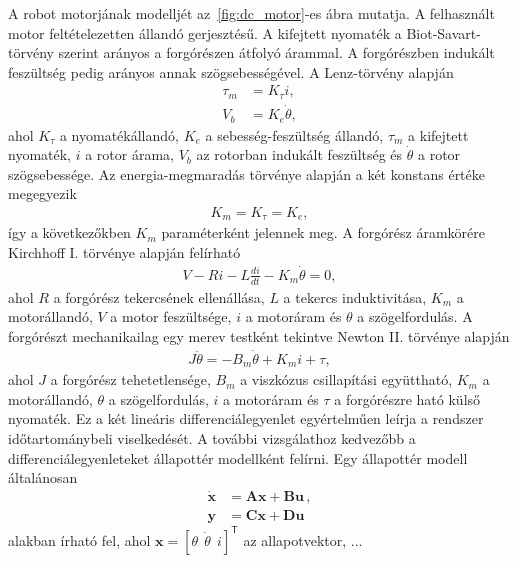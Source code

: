A robot motorjának modelljét az~\ref{fig:dc_motor}-es ábra mutatja. A felhasznált motor feltételezetten állandó gerjesztésű. A kifejtett nyomaték 
a Biot-Savart-törvény szerint arányos a forgórészen átfolyó árammal. A forgórészben
indukált feszültség pedig arányos annak szögsebességével. A Lenz-törvény alapján 
\begin{equation}
\begin{split}
    \tau_m &= K_\tau i, \\
    V_b &= K_e \dot\theta,
\end{split}
\end{equation}
ahol $K_\tau$ a nyomatékállandó, $K_e$ a sebesség-feszültség állandó, $\tau_m$ a kifejtett 
nyomaték, $i$ a rotor árama, $V_b$ az rotorban indukált feszültség és $\dot\theta$ a rotor szögsebessége.
Az energia-megmaradás törvénye alapján a két konstans értéke megegyezik
\begin{align}
    K_m = K_\tau = K_e,
\end{align}
így a következőkben $K_m$ paraméterként jelennek meg. A forgórész áramkörére Kirchhoff I. törvénye alapján felírható
\begin{align}\label{eq:armature_circuit}
    V - Ri - L\frac{di}{dt} - K_m\dot\theta = 0,
\end{align}
ahol $R$ a forgórész tekercsének ellenállása, $L$ a tekercs induktivitása, 
$K_m$ a motorállandó, $V$ a motor feszültsége, $i$ a motoráram és $\theta$ a szögelfordulás.
A forgórészt mechanikailag egy merev testként tekintve Newton II. törvénye alapján
\begin{align}\label{eq:rotor_dynamics}
    J\ddot\theta = -B_m\dot\theta + K_m i + \tau,
\end{align}
ahol $J$ a forgórész tehetetlensége, $B_m$ a viszkózus csillapítási együttható, 
$K_m$ a motorállandó, $\theta$ a szögelfordulás, $i$ a motoráram és $\tau$ a forgórészre
ható külső nyomaték. Ez a két lineáris differenciálegyenlet egyértelműen leírja a 
rendszer időtartománybeli viselkedését.
A további vizsgálathoz kedvezőbb a differenciálegyenleteket állapottér modellként felírni.
Egy állapottér modell általánosan
\begin{equation}\label{eq:state_space_generic}
\begin{split}
    \dot{\mathbf x} &= \mathbf A \mathbf x + \mathbf B \mathbf u\,,\\
    \mathbf y &= \mathbf C \mathbf x + \mathbf D \mathbf u
\end{split}
\end{equation} 
alakban írható fel, ahol \(\mathbf x = [\theta~~\dot \theta~~i]^{\mathsf T}\) az allapotvektor, ...
